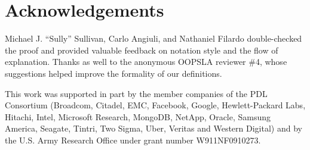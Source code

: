 \documentclass[10pt,times,numbers]{../sigplanconf}
\begin{document}





\section{Acknowledgements}

Michael J. ``Sully'' Sullivan, Carlo Angiuli, and Nathaniel Filardo double-checked the proof and provided valuable feedback on notation style and the flow of explanation.
Thanks as well to the anonymous OOPSLA reviewer \#4, whose suggestions helped improve the formality of our definitions.

This work was supported in part by
the member companies of the PDL Consortium (Broadcom,
Citadel, EMC, Facebook, Google, Hewlett-Packard Labs, Hitachi, Intel,
Microsoft Research, MongoDB, NetApp, Oracle, Samsung America, Seagate,
Tintri, Two Sigma, Uber, Veritas and Western Digital)
and by the U.S. Army Research Office under grant number W911NF0910273.


{}
\end{document}
